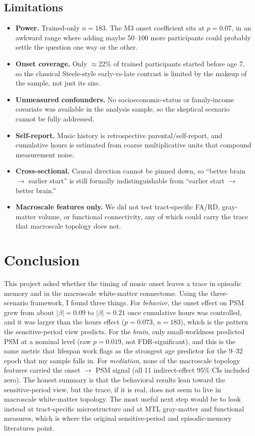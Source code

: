 \documentclass[11pt]{article}
\begin{document}
\subsection{Limitations}
\begin{itemize}[leftmargin=1.4em,itemsep=2pt]
  \item \textbf{Power.} Trained-only $n=183$. The M3 onset coefficient sits at $p=0.07$, in an awkward range where adding maybe 50--100 more participants could probably settle the question one way or the other.
  \item \textbf{Onset coverage.} Only $\approx22\%$ of trained participants started before age 7, so the classical Steele-style early-vs-late contrast is limited by the makeup of the sample, not just its size.
  \item \textbf{Unmeasured confounders.} No socioeconomic-status or family-income covariate was available in the analysis sample, so the skeptical scenario cannot be fully addressed.
  \item \textbf{Self-report.} Music history is retrospective parental/self-report, and cumulative hours is estimated from coarse multiplicative units that compound measurement noise.
  \item \textbf{Cross-sectional.} Causal direction cannot be pinned down, so ``better brain $\to$ earlier start'' is still formally indistinguishable from ``earlier start $\to$ better brain.''
  \item \textbf{Macroscale features only.} We did not test tract-specific FA/RD, gray-matter volume, or functional connectivity, any of which could carry the trace that macroscale topology does not.
\end{itemize}

\section{Conclusion}
This project asked whether the timing of music onset leaves a trace in episodic memory and in the macroscale white-matter connectome. Using the three-scenario framework, I found three things. For \emph{behavior}, the onset effect on PSM grew from about $|\beta|=0.09$ to $|\beta|=0.21$ once cumulative hours was controlled, and it was larger than the hours effect ($p=0.073$, $n=183$), which is the pattern the sensitive-period view predicts. For the \emph{brain}, only small-worldness predicted PSM at a nominal level (raw $p=0.019$, not FDR-significant), and this is the same metric that lifespan work \citep{mousley2025} flags as the strongest age predictor for the 9--32 epoch that my sample falls in. For \emph{mediation}, none of the macroscale topology features carried the onset $\to$ PSM signal (all 11 indirect-effect 95\% CIs included zero). The honest summary is that the behavioral results lean toward the sensitive-period view, but the trace, if it is real, does not seem to live in macroscale white-matter topology. The most useful next step would be to look instead at tract-specific microstructure and at MTL gray-matter and functional measures, which is where the original sensitive-period and episodic-memory literatures point.
\end{document}
